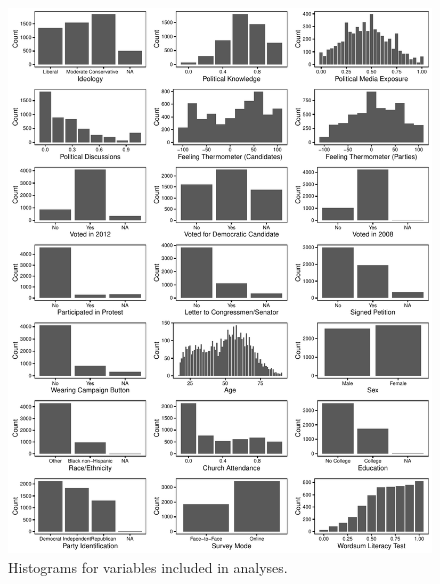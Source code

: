\documentclass[12pt]{article}
\begin{document}
\begin{figure}[h]\centering
\includegraphics[width=\textwidth]{../calc/fig/app_desc.pdf}
\caption{Histograms for variables included in analyses.}\label{fig:app_desc}
\end{figure}
\end{document}
